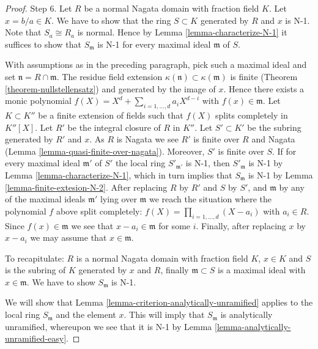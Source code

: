 \begin{proof}
\medskip\noindent
Step 6. Let $R$ be a normal Nagata domain with fraction field $K$.
Let $x = b/a \in K$. We have to show that the ring $S \subset K$
generated by $R$ and $x$ is N-1. Note that $S_a \cong R_a$ is normal.
Hence by Lemma \ref{lemma-characterize-N-1} it suffices to show that
$S_{\mathfrak m}$ is N-1 for every maximal ideal $\mathfrak m$ of $S$.

\medskip\noindent
With assumptions as in the preceding paragraph, pick such a maximal
ideal and set $\mathfrak n = R \cap \mathfrak m$. The residue field
extension $\kappa(\mathfrak n) \subset \kappa(\mathfrak m)$ is finite
(Theorem \ref{theorem-nullstellensatz}) and generated by the image of $x$.
Hence there exists a monic polynomial
$f(X) = X^d + \sum_{i = 1, \ldots, d} a_iX^{d -i}$ with
$f(x) \in \mathfrak m$. Let $K \subset K''$ be a finite extension
of fields such that $f(X)$ splits completely in $K''[X]$.
Let $R'$ be the integral closure of $R$ in $K''$.
Let $S' \subset K'$ be the subring generated by $R'$ and $x$.
As $R$ is Nagata we see $R'$ is finite over $R$ and Nagata
(Lemma \ref{lemma-quasi-finite-over-nagata}).
Moreover, $S'$ is finite over $S$. If for every maximal ideal
$\mathfrak m'$ of $S'$ the local ring $S'_{\mathfrak m'}$ is
N-1, then $S'_{\mathfrak m}$ is N-1 by
Lemma \ref{lemma-characterize-N-1}, which in turn
implies that $S_{\mathfrak m}$ is N-1 by
Lemma \ref{lemma-finite-extesion-N-2}.
After replacing $R$ by $R'$ and $S$ by $S'$, and $\mathfrak m$ by
any of the maximal ideals $\mathfrak m'$ lying over $\mathfrak m$
we reach the situation where the polynomial $f$ above split completely:
$f(X) = \prod_{i = 1, \ldots, d} (X - a_i)$ with $a_i \in R$.
Since $f(x) \in \mathfrak m$ we see that $x - a_i \in \mathfrak m$
for some $i$. Finally, after replacing $x$ by $x - a_i$ we may assume
that $x \in \mathfrak m$.

\medskip\noindent
To recapitulate: $R$ is a normal Nagata domain with fraction field $K$,
$x \in K$ and $S$ is the subring of $K$ generated by $x$ and $R$,
finally $\mathfrak m \subset S$ is a maximal ideal with $x \in \mathfrak m$.
We have to show $S_{\mathfrak m}$ is N-1.

\medskip\noindent
We will show that Lemma \ref{lemma-criterion-analytically-unramified}
applies to the local ring
$S_{\mathfrak m}$ and the element $x$. This will imply that
$S_{\mathfrak m}$ is analytically unramified, whereupon we
see that it is N-1 by Lemma \ref{lemma-analytically-unramified-easy}.


\end{proof}
